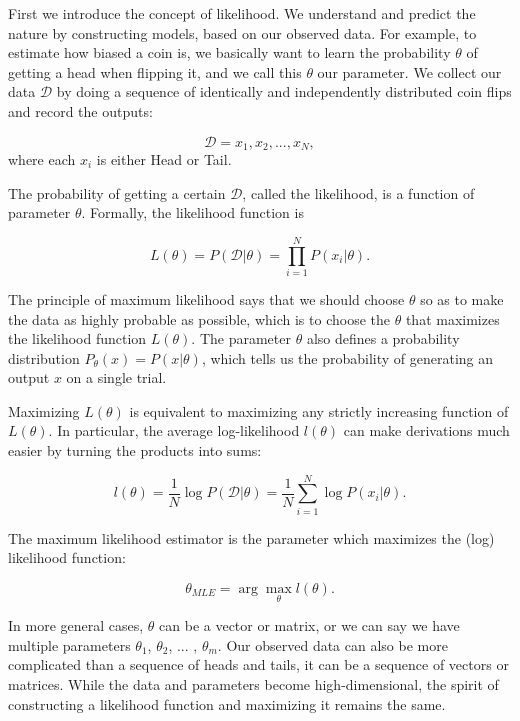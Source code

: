 \documentclass[11pt]{article}
\theoremstyle{definition}
\begin{document}
First we introduce the concept of likelihood. We understand and predict the nature by constructing models, based on our observed data. For example, to estimate how biased a coin is, we basically want to learn the probability $\theta$ of getting a head when flipping it, and we call this $\theta$ our parameter.  We collect our data $\mathcal{D}$ by doing a sequence of identically and independently distributed coin flips and record the outputs:

\begin{equation}
    \mathcal{D} = x_1, x_2, ... , x_N,
\end{equation}
where each $x_i$ is either Head or Tail.

The probability of getting a certain $\mathcal{D}$, called the likelihood, is a function of parameter $\theta$. Formally, the likelihood function is 

\begin{equation}
    L(\theta) = P(\mathcal{D}|\theta) = \prod_{i = 1}^N
    P(x_i|\theta).
\end{equation}

The principle of maximum likelihood says that we should choose $\theta$ so as to make the data as highly probable as possible, which is to choose the $\theta$ that maximizes the likelihood function $L(\theta)$. The parameter $\theta$ also defines a probability distribution $P_{\theta}(x) = P(x|\theta)$, which tells us the probability of generating an output $x$ on a single trial.


Maximizing $L(\theta)$ is equivalent to maximizing any strictly increasing function of $L(\theta)$. In particular, the average log-likelihood $l(\theta)$ can make derivations much easier by turning the products into sums:

\begin{equation}
    l(\theta) = \frac{1}{N} \log P(\mathcal{D}|\theta) = \frac{1}{N} \sum_{i = 1}^N  \log P(x_i|\theta).
\end{equation}

The maximum likelihood estimator is the parameter which maximizes the (log) likelihood function:

\begin{equation}
    \theta_{MLE} = \arg \max_{\theta} l(\theta).
\end{equation}

In more general cases, $\theta$ can be a vector or matrix, or we can say we have multiple parameters $\theta_1$, $\theta_2$, ... , $\theta_m$. Our observed data can also be more complicated than a sequence of heads and tails, it can be a sequence of vectors or matrices. While the data and parameters become high-dimensional, the spirit of constructing a likelihood function and maximizing it remains the same.
\end{document}
